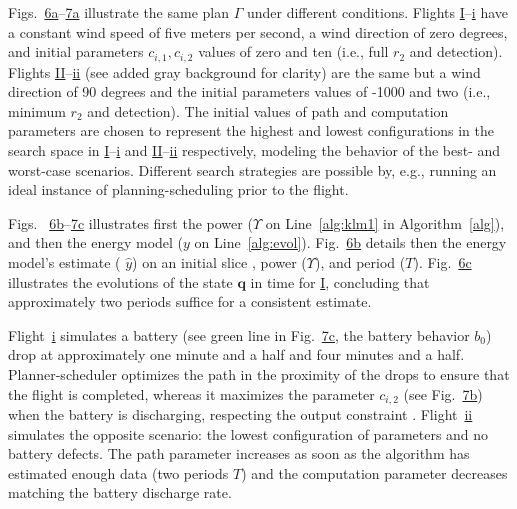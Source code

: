 \documentclass[letterpaper,10pt,conference,twoside]{IEEEtran}
\theoremstyle{definition}
\begin{document}
Fig{\color{black}s}.~{\color{black}\hyperref[fig:stat]{6a}--\hyperref[fig:dyn]{7a}} 
illustrate the same plan $\Gamma$ under different conditions. Flights \hyperref[fig:trajs-I-static]{I}--\hyperref[fig:trajs-dyn-i]{i} have a constant wind speed of five meters per second, a wind direction of zero degrees, and initial parameters $c_{i,1},c_{i,2}$ values of zero and ten (i.e., full $r_2$ and detection). Flights \hyperref[fig:trajs-II-static]{II}--\hyperref[fig:trajs-dyn-ii]{ii} (see added gray background for clarity) are the same but a wind direction of 90 degrees and the initial parameters values of -1000 and two (i.e., minimum $r_2$ and detection). 
{\color{black} The initial values of path and computation parameters are chosen to represent the highest and lowest configurations in the search space in \hyperref[fig:trajs-I-static]{I}--\hyperref[fig:trajs-dyn-i]{i} and \hyperref[fig:trajs-II-static]{II}--\hyperref[fig:trajs-dyn-ii]{ii} respectively, modeling the behavior of the best- and worst-case scenarios.
Different search strategies are possible by, e.g., running an ideal instance of planning-scheduling prior to the flight.}

Fig{\color{black}s}.~%
{\color{black}\hyperref[fig:stat]{6b}--\hyperref[fig:dyn]{7c}} %
illustrates first the power ($\Upsilon$ on Line~\ref{alg:klm1} in Algorithm~\ref{alg}), and then the energy model ($y$ on Line~\ref{alg:evol}).
{\color{black} Fig.~\hyperref[fig:stat]{6b}} %
details then the energy model's estimate (%
{\color{black}${\hat{y}}$}) on an initial slice%
, power ($\Upsilon$), and period ($T$).
{\color{black} Fig.~\hyperref[fig:stat]{6c}} illustrates the evolutions of the state $\mathbf{q}$ in time {\color{black}for \hyperref[fig:ener:static-I]{I}}, concluding that approximately two periods suffice for a consistent %
estimate. 

Flight~\hyperref[fig:ener-dyn-i]{i} simulates a battery ({\color{black}see} green line {\color{black}in Fig.~\hyperref[fig:dyn]{7c}}, the battery behavior $b_0$) drop at approximately one minute and a half and four minutes and a half. Planner-scheduler optimizes the path in the proximity of the drops to ensure that the flight is completed, whereas it maximizes the parameter $c_{i,2}$ {\color{black}(see Fig.~\hyperref[fig:dyn]{7b})} when the battery is discharging, respecting the output constraint%
. Flight~\hyperref[fig:ener-dyn-ii]{ii} simulates the opposite scenario: the lowest configuration of parameters and no battery defects. The path parameter increases as soon as the algorithm has estimated enough data (two periods $T$) 
and the computation parameter decreases matching the battery discharge rate. 
\end{document}

